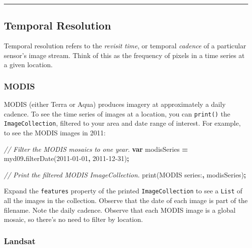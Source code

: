 \documentclass[
]{article}
\newenvironment{Shaded}{\begin{snugshade}}{\end{snugshade}}
\newcommand{\CommentTok}[1]{\textcolor[rgb]{0.56,0.35,0.01}{\textit{#1}}}
\newcommand{\FunctionTok}[1]{\textcolor[rgb]{0.00,0.00,0.00}{#1}}
\newcommand{\KeywordTok}[1]{\textcolor[rgb]{0.13,0.29,0.53}{\textbf{#1}}}
\newcommand{\NormalTok}[1]{#1}
\newcommand{\OperatorTok}[1]{\textcolor[rgb]{0.81,0.36,0.00}{\textbf{#1}}}
\newcommand{\StringTok}[1]{\textcolor[rgb]{0.31,0.60,0.02}{#1}}
\begin{document}
\begin{center}\rule{0.5\linewidth}{0.5pt}\end{center}

\hypertarget{temporal-resolution}{%
\subsection{Temporal Resolution}\label{temporal-resolution}}

Temporal resolution refers to the \emph{revisit time}, or temporal \emph{cadence} of a particular sensor's image stream. Think of this as the frequency of pixels in a time series at a given location.

\hypertarget{modis-1}{%
\subsubsection{MODIS}\label{modis-1}}

MODIS (either Terra or Aqua) produces imagery at approximately a daily cadence. To see the time series of images at a location, you can \texttt{print()} the \texttt{ImageCollection}, filtered to your area and date range of interest. For example, to see the MODIS images in 2011:

\begin{Shaded}
\begin{Highlighting}[]
\CommentTok{// Filter the MODIS mosaics to one year.   }
\KeywordTok{var}\NormalTok{ modisSeries }\OperatorTok{=}\NormalTok{ myd09}\OperatorTok{.}\FunctionTok{filterDate}\NormalTok{(}\StringTok{\textquotesingle{}2011{-}01{-}01\textquotesingle{}}\OperatorTok{,} \StringTok{\textquotesingle{}2011{-}12{-}31\textquotesingle{}}\NormalTok{)}\OperatorTok{;}      

\CommentTok{// Print the filtered  MODIS ImageCollection.   }
\FunctionTok{print}\NormalTok{(}\StringTok{\textquotesingle{}MODIS series:\textquotesingle{}}\OperatorTok{,}\NormalTok{ modisSeries)}\OperatorTok{;}  
\end{Highlighting}
\end{Shaded}

Expand the \texttt{features} property of the printed \texttt{ImageCollection} to see a \texttt{List} of all the images in the collection. Observe that the date of each image is part of the filename. Note the daily cadence. Observe that each MODIS image is a global mosaic, so there's no need to filter by location.

\hypertarget{landsat}{%
\subsubsection{Landsat}\label{landsat}}
\end{document}
